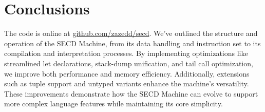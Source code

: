 \section{Conclusions}
The code is online at \href{https://github.com/zazedd/secd}{github.com/zazedd/secd}.
We’ve outlined the structure and operation of the SECD Machine, from its data handling and instruction set to its compilation and interpretation processes. By implementing optimizations like streamlined let declarations, stack-dump unification, and tail call optimization, we improve both performance and memory efficiency. Additionally, extensions such as tuple support and untyped variants enhance the machine’s versatility. These improvements demonstrate how the SECD Machine can evolve to support more complex language features while maintaining its core simplicity.
